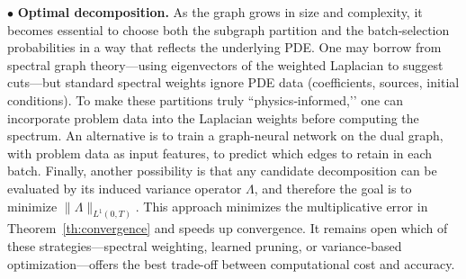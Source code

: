 \documentclass[10pt,a4paper]{amsart}
\def\to{\rightarrow}
\begin{document}




\noindent 
$\bullet$ \textbf{Optimal decomposition.}  
As the graph grows in size and complexity, it becomes essential to choose both the subgraph partition and the batch‐selection probabilities in a way that reflects the underlying PDE.  One may borrow from spectral graph theory—using eigenvectors of the weighted Laplacian to suggest cuts—but standard spectral weights ignore PDE data (coefficients, sources, initial conditions).  To make these partitions truly “physics‐informed,’’ one can incorporate problem data into the Laplacian weights before computing the spectrum.  An alternative is to train a graph-neural network on the dual graph, with problem data as input features, to predict which edges to retain in each batch.  Finally, another possibility is that any candidate decomposition can be evaluated by its induced variance operator $\Lambda$, and therefore the goal is to minimize $\|\Lambda\|_{L^1(0,T)}$. This approach minimizes the multiplicative error in Theorem~\ref{th:convergence} and speeds up convergence.  It remains open which of these strategies—spectral weighting, learned pruning, or variance‐based optimization—offers the best trade-off between computational cost and accuracy. 
\end{document}
